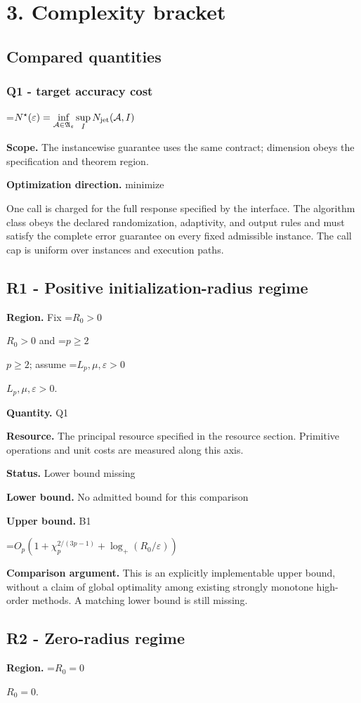 \documentclass[10pt,a4paper]{article}
\newcommand{\AtlasMath}[1]{\par\begingroup\centering\setbox0=\hbox{$\displaystyle #1$}\ifdim\wd0>1.4\linewidth\typeout{ATLAS WIDE FORMULA: \the\wd0}\fi\ifdim\wd0>\linewidth\resizebox{\linewidth}{!}{\box0}\else\box0\fi\par\endgroup}
\newcommand{\AtlasInlineMath}[1]{\begingroup\setbox0=\hbox{$#1$}\ifdim\wd0>.4\linewidth\endgroup\AtlasMath{#1}\else\endgroup$#1$\fi}
\begin{document}
\section{3. Complexity bracket}
\subsection{Compared quantities}
\subsubsection{Q1 - target accuracy cost}
\AtlasMath{N^\star(\varepsilon)=\inf_{\mathcal A\in\mathfrak A_\varepsilon}\sup_I N_{\rm jet}(\mathcal A,I)}
\textbf{Scope.} The instancewise guarantee uses the same contract; dimension obeys the specification and theorem region.

\textbf{Optimization direction.} minimize

One call is charged for the full response specified by the interface. The algorithm class obeys the declared randomization, adaptivity, and output rules and must satisfy the complete error guarantee on every fixed admissible instance. The call cap is uniform over instances and execution paths.

\subsection{R1 - Positive initialization-radius regime}
\textbf{Region.} Fix \AtlasInlineMath{R_0>0} and \AtlasInlineMath{p\ge2}; assume \AtlasInlineMath{L_p,\mu,\varepsilon>0}.

\textbf{Quantity.} Q1

\textbf{Resource.} The principal resource specified in the resource section. Primitive operations and unit costs are measured along this axis.

\textbf{Status.} Lower bound missing

\textbf{Lower bound.} No admitted bound for this comparison

\textbf{Upper bound.} B1

\AtlasMath{O_p\!\left(1+\chi_p^{2/(3p-1)}+\log_+(R_0/\varepsilon)\right)}
\textbf{Comparison argument.} This is an explicitly implementable upper bound, without a claim of global optimality among existing strongly monotone high-order methods. A matching lower bound is still missing.

\subsection{R2 - Zero-radius regime}
\textbf{Region.} \AtlasInlineMath{R_0=0}.
\end{document}
